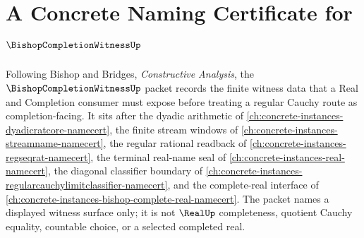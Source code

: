 \chapter{A Concrete Naming Certificate for $\BishopCompletionWitnessUp$}
\label{ch:concrete-instances-bishop-completion-witness-namecert}

Following Bishop and Bridges, \emph{Constructive Analysis}, the $\BishopCompletionWitnessUp$ packet records the finite witness data that a Real and Completion consumer must expose before treating a regular Cauchy route as completion-facing. It sits after the dyadic arithmetic of \autoref{ch:concrete-instances-dyadicratcore-namecert}, the finite stream windows of \autoref{ch:concrete-instances-streamname-namecert}, the regular rational readback of \autoref{ch:concrete-instances-regseqrat-namecert}, the terminal real-name seal of \autoref{ch:concrete-instances-real-namecert}, the diagonal classifier boundary of \autoref{ch:concrete-instances-regularcauchylimitclassifier-namecert}, and the complete-real interface of \autoref{ch:concrete-instances-bishop-complete-real-namecert}. The packet names a displayed witness surface only; it is not $\RealUp$ completeness, quotient Cauchy equality, countable choice, or a selected completed real.


